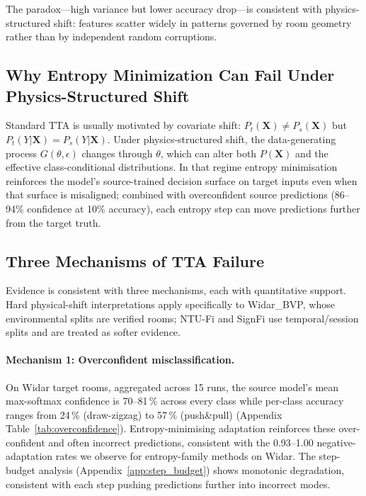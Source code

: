 The paradox---high variance but lower accuracy drop---is consistent with physics-structured shift: features scatter widely in patterns governed by room geometry rather than by independent random corruptions.

\subsection{Why Entropy Minimization Can Fail Under Physics-Structured Shift}

Standard TTA is usually motivated by covariate shift: $P_t(\mathbf{X}) \neq P_s(\mathbf{X})$ but $P_t(Y|\mathbf{X}) = P_s(Y|\mathbf{X})$. Under physics-structured shift, the data-generating process $G(\theta, \epsilon)$ changes through $\theta$, which can alter both $P(\mathbf{X})$ and the effective class-conditional distributions. In that regime entropy minimisation reinforces the model's source-trained decision surface on target inputs even when that surface is misaligned; combined with overconfident source predictions (86--94\% confidence at 10\% accuracy), each entropy step can move predictions further from the target truth.

\subsection{Three Mechanisms of TTA Failure}

Evidence is consistent with three mechanisms, each with quantitative support. Hard physical-shift interpretations apply specifically to Widar\_BVP, whose environmental splits are verified rooms; NTU-Fi and SignFi use temporal/session splits and are treated as softer evidence.

\paragraph{Mechanism 1: Overconfident misclassification.} On Widar target rooms, aggregated across 15 runs, the source model's mean max-softmax confidence is 70--81\,\% across every class while per-class accuracy ranges from 24\,\% (draw-zigzag) to 57\,\% (push\&pull) (Appendix Table~\ref{tab:overconfidence}). Entropy-minimising adaptation reinforces these over-confident and often incorrect predictions, consistent with the 0.93--1.00 negative-adaptation rates we observe for entropy-family methods on Widar. The step-budget analysis (Appendix~\ref{app:step_budget}) shows monotonic degradation, consistent with each step pushing predictions further into incorrect modes.

